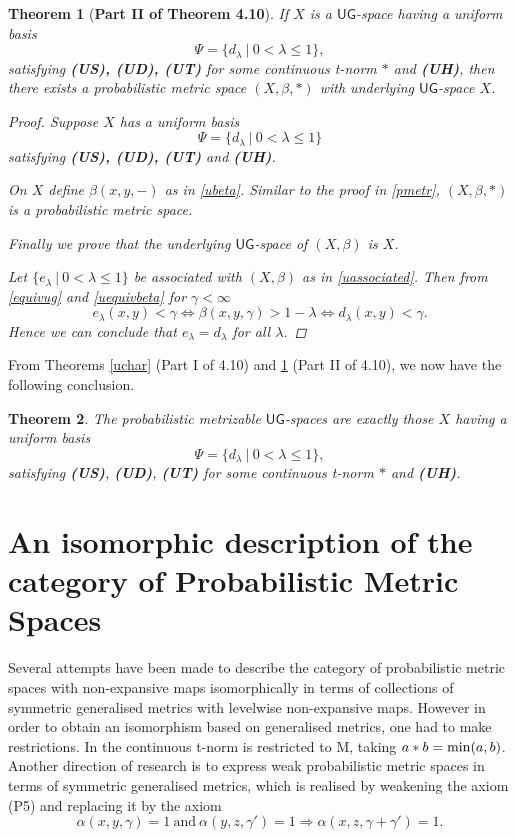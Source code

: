 \documentclass[12pt,a4paper]{amsart}
\theoremstyle{theorem}
\newtheorem{theorem}{Theorem}[section]
\theoremstyle{definition}
\newcommand{\ug}{\ensuremath{\mathsf{UG}}}
\renewcommand{\min}{\mymin}
\DeclareMathOperator*{\mymin}{mi\vphantom{p}n}
\renewcommand{\a}{\ensuremath{\alpha}}
\renewcommand{\b}{\ensuremath{\beta}}
\renewcommand{\l}{\ensuremath{\lambda}}
\begin{document}
{\begin{theorem}[\bf Part II of Theorem 4.10]\label{upmetr}
If $X$ is a $\ug$-space having a uniform basis
$$
\Psi = \{ d_\l \ | \ 0  < \l \leq 1 \},
$$
satisfying {\bf(US), (UD), (UT)} for some continuous t-norm $*$ and {\bf(UH)}, then there exists a probabilistic metric space $(X,\b, *)$ with underlying $\ug$-space $X$.

\begin{proof}
Suppose
$X$ has a uniform basis 
$$
\Psi = \{ d_\l  \ | \ 0  < \l \leq 1 \}
$$
satisfying {\bf(US), (UD), (UT)} and {\bf(UH)}.

On $X$ define $\b(x,y, -)$ as in \eqref{ubeta}.
Similar to the proof in \ref{pmetr},
$(X, \b, *) $ is a probabilistic metric space.



Finally we prove that the underlying $\ug$-space of $(X,\b)$ is $X$.

Let $\{ e_\l \ | \ 0 < \l \leq 1 \}$ be associated with $(X,\b)$ as in \eqref{uassociated}. Then from \eqref{equivug}  and \ref{uequivbeta} for $\gamma<\infty$ 
$$
e_\l(x, y) < \gamma \Leftrightarrow \b(x,y, \gamma) > 1 - \l \Leftrightarrow d_\l(x, y) < \gamma.
$$
Hence we can conclude that $e_\l = d_{\l}$ for all $\l$.
\end{proof}
\end{theorem}

From Theorems \ref{uchar} (Part I of 4.10) and \ref{upmetr} (Part II of 4.10), we now have the following conclusion.

\begin{theorem}
The probabilistic metrizable $\ug$-spaces are exactly those $X$ having a uniform basis 
$$
\Psi = \{ d_\l \ | \ 0  < \l \leq 1 \},
$$
satisfying {\bf(US)}, {\bf(UD)}, {\bf(UT)} for some continuous t-norm $*$ and {\bf(UH)}. 
\end{theorem}



\section{An isomorphic description of the category of Probabilistic Metric Spaces}

Several attempts have been made to describe the category of probabilistic metric spaces with non-expansive maps isomorphically in terms of collections of symmetric generalised metrics with levelwise non-expansive maps.  However in order to obtain an isomorphism based on generalised metrics, one had to make restrictions. In \cite{SS} the continuous t-norm  is restricted to M, taking  $a * b = \min (a,b)$. Another direction of research is to express weak probabilistic metric spaces in terms of symmetric generalised metrics, which is realised by weakening the axiom (P5) and replacing it by the axiom \cite{N} 
$$
\a(x,y,\gamma) =1\ \text{and} \ \a(y,z, \gamma') =1 \Rightarrow \a(x,z, \gamma + \gamma') = 1.
$$

}
\end{document}
